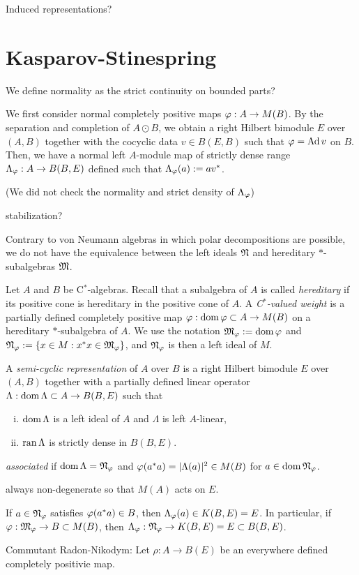 \documentclass{../../large}
\begin{document}
Induced representations?




\section{Kasparov-Stinespring}
We define normality as the strict continuity on bounded parts?

We first consider normal completely positive maps $\varphi:A\to M(B)$.
By the separation and completion of $A\odot B$, we obtain a right Hilbert bimodule $E$ over $(A,B)$ together with the cocyclic data $v\in B(E,B)$ such that $\varphi=\operatorname{Ad} v$ on $B$.
Then, we have a normal left $A$-module map of strictly dense range $\Lambda_\varphi:A\to B(B,E)$ defined such that $\Lambda_\varphi(a):=av^*$.

(We did not check the normality and strict density of $\Lambda_\varphi$)

stabilization?






Contrary to von Neumann algebras in which polar decompositions are possible, we do not have the equivalence between the left ideals $\mathfrak{N}$ and hereditary $*$-subalgebras $\mathfrak{M}$.


\begin{prb}
Let $A$ and $B$ be C$^*$-algebras.
Recall that a subalgebra of $A$ is called \emph{hereditary} if its positive cone is hereditary in the positive cone of $A$.
A \emph{C$^*$-valued weight} is a partially defined completely positive map $\varphi:\operatorname{dom}\varphi\subset A\to M(B)$ on a hereditary $*$-subalgebra of $A$.
We use the notation $\mathfrak{M}_\varphi:=\operatorname{dom}\varphi$ and $\mathfrak{N}_\varphi:=\{x\in M:x^*x\in\mathfrak{M}_\varphi\}$, and $\mathfrak{N}_\varphi$ is then a left ideal of $M$.


A \emph{semi-cyclic representation} of $A$ over $B$ is a right Hilbert bimodule $E$ over $(A,B)$ together with a partially defined linear operator $\Lambda:\operatorname{dom}\Lambda\subset A\to B(B,E)$ such that 
\begin{enumerate}[(i)]
\item $\operatorname{dom}\Lambda$ is a left ideal of $A$ and $\Lambda$ is left $A$-linear,
\item $\operatorname{ran}\Lambda$ is strictly dense in $B(B,E)$.
\end{enumerate}
\emph{associated} if $\operatorname{dom}\Lambda=\mathfrak{N}_\varphi$ and $\varphi(a^*a)=|\Lambda(a)|^2\in M(B)$ for $a\in\operatorname{dom}\mathfrak{N}_\varphi$.

\begin{parts}
\item always non-degenerate so that $M(A)$ acts on $E$.
\item If $a\in\mathfrak{N}_\varphi$ satisfies $\varphi(a^*a)\in B$, then $\Lambda_\varphi(a)\in K(B,E)=E$. In particular, if $\varphi:\mathfrak{M}_\varphi\to B\subset M(B)$, then $\Lambda_\varphi:\mathfrak{N}_\varphi\to K(B,E)=E\subset B(B,E)$.
\item Commutant Radon-Nikodym: Let $\rho:A\to B(E)$ be an everywhere defined completely positivie map.
\end{parts}

\end{prb}
\end{document}
